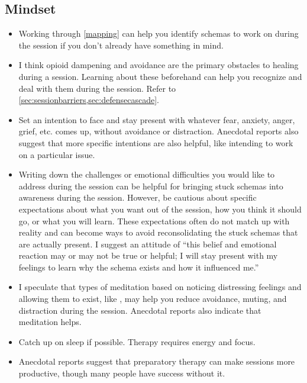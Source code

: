 \documentclass[11pt,oneside]{book}
\begin{document}
\subsection*{Mindset}
\begin{itemize}
    \item Working through \cref{mapping} can help you identify schemas to work on during the session if you don't already have something in mind.
    \item I think opioid dampening and avoidance are the primary obstacles to healing during a session. Learning about these beforehand can help you recognize and deal with them during the session. Refer to \cref{sec:sessionbarriers,sec:defensecascade}.
    \item Set an intention to face and stay present with whatever fear, anxiety, anger, grief, etc. comes up, without avoidance or distraction. Anecdotal reports also suggest that more specific intentions are also helpful, like intending to work on a particular issue.
    \item Writing down the challenges or emotional difficulties you would like to address during the session can be helpful for bringing stuck schemas into awareness during the session. However, be cautious about specific expectations about what you want out of the session, how you think it should go, or what you will learn. These expectations often do not match up with reality and can become ways to avoid reconsolidating the stuck schemas that are actually present. I suggest an attitude of \enquote{this belief and emotional reaction may or may not be true or helpful; I will stay present with my feelings to learn why the schema exists and how it influenced me.}
    \item I speculate that types of meditation based on noticing distressing feelings and allowing them to exist, like \textcite{rain}, may help you reduce avoidance, muting, and distraction during the session. Anecdotal reports also indicate that meditation helps.
    \item Catch up on sleep if possible. Therapy requires energy and focus.
    \item Anecdotal reports suggest that preparatory therapy can make sessions more productive, though many people have success without it.
\end{itemize}
\end{document}
